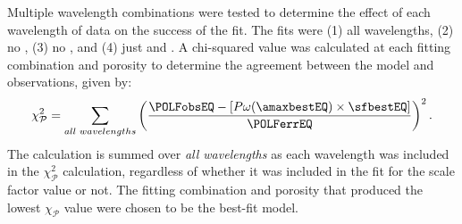 %
%
%
%
%
Multiple wavelength combinations were tested to determine the effect of each wavelength of data on the success of the fit. The fits were (1) all wavelengths, (2) no \bfiveNS, (3) no \bsixNS, and (4) just \bfour and \bsevenNS. A chi-squared value was calculated at each fitting combination and porosity to determine the agreement between the model and observations, given by: 
\begin{equation}
\chi_\mathcal{P}^2 = \sum_{all\text{ }wavelengths} \left(\frac{\POLFobsEQ- [P\omega (\amaxbestEQ) \times \sfbestEQ]}{\POLFerrEQ}\right)^2.
    \label{eq: chi_squared_dust_model}
\end{equation}
\noindent The calculation is summed over \emph{all wavelengths} as each wavelength was included in the $\chi_\mathcal{P}^2$ calculation, regardless of whether it was included in the fit for the scale factor value or not. The fitting combination and porosity that produced the lowest $\chi_\mathcal{P}$ value were chosen to be the best-fit model.












